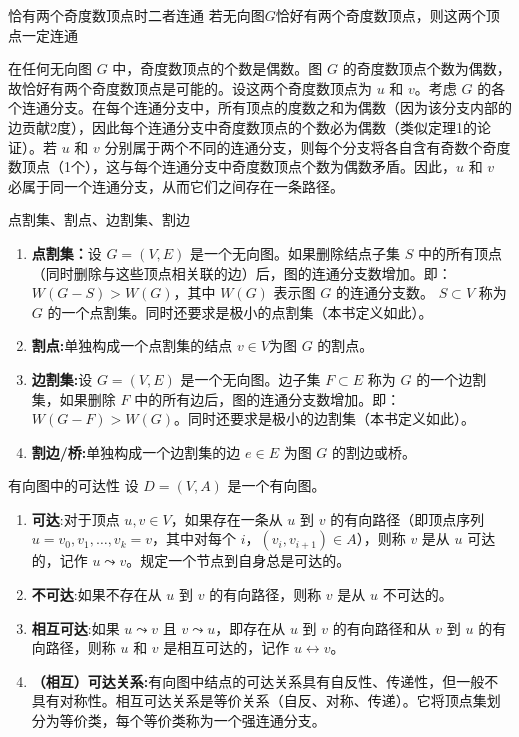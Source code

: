 \documentclass[lang=cn,11pt]{elegantbook}
\begin{document}
\begin{theorem}{恰有两个奇度数顶点时二者连通}
若无向图$G$恰好有两个奇度数顶点，则这两个顶点一定连通
\end{theorem}
在任何无向图 $G$ 中，奇度数顶点的个数是偶数。图 $G$ 的奇度数顶点个数为偶数，故恰好有两个奇度数顶点是可能的。设这两个奇度数顶点为 $u$ 和 $v$。考虑 $G$ 的各个连通分支。在每个连通分支中，所有顶点的度数之和为偶数（因为该分支内部的边贡献2度），因此每个连通分支中奇度数顶点的个数必为偶数（类似定理1的论证）。若 $u$ 和 $v$ 分别属于两个不同的连通分支，则每个分支将各自含有奇数个奇度数顶点（1个），这与每个连通分支中奇度数顶点个数为偶数矛盾。因此，$u$ 和 $v$ 必属于同一个连通分支，从而它们之间存在一条路径。
\begin{definition}{点割集、割点、边割集、割边}
\begin{enumerate}
    \item\textbf{点割集：}设 $G = (V, E)$ 是一个无向图。如果删除结点子集 $S$ 中的所有顶点（同时删除与这些顶点相关联的边）后，图的连通分支数增加。即：$W(G - S) > W(G)$，其中 $W(G)$ 表示图 $G$ 的连通分支数。 $S \subset V$ 称为 $G$ 的一个点割集。同时还要求是极小的点割集（本书定义如此）。
    \item \textbf{割点:}单独构成一个点割集的结点 $v \in V$为图 $G$ 的割点。
    \item \textbf{边割集:}设 $G = (V, E)$ 是一个无向图。边子集 $F \subset E$ 称为 $G$ 的一个边割集，如果删除 $F$ 中的所有边后，图的连通分支数增加。即：$W(G - F) > W(G)$。同时还要求是极小的边割集（本书定义如此）。
\item\textbf{割边/桥:}单独构成一个边割集的边 $e\in E$ 为图 $G$ 的割边或桥。
\end{enumerate}
\end{definition}
\begin{definition}{有向图中的可达性}
设 $D = (V, A)$ 是一个有向图。
\begin{enumerate}
\item\textbf{可达}:对于顶点 $u, v \in V$，如果存在一条从 $u$ 到 $v$ 的有向路径（即顶点序列 $u = v_0, v_1, \ldots, v_k = v$，其中对每个 $i$，$(v_i, v_{i+1}) \in A$），则称 $v$ 是从 $u$ 可达的，记作 $u \leadsto v$。规定一个节点到自身总是可达的。
\item\textbf{不可达}:如果不存在从 $u$ 到 $v$ 的有向路径，则称 $v$ 是从 $u$ 不可达的。
\item\textbf{相互可达}:如果 $u \leadsto v$ 且 $v \leadsto u$，即存在从 $u$ 到 $v$ 的有向路径和从 $v$ 到 $u$ 的有向路径，则称 $u$ 和 $v$ 是相互可达的，记作 $u \leftrightarrow v$。
\item\textbf{（相互）可达关系:}有向图中结点的可达关系具有自反性、传递性，但一般不具有对称性。相互可达关系是等价关系（自反、对称、传递）。它将顶点集划分为等价类，每个等价类称为一个强连通分支。
\end{enumerate}
\end{definition}
\end{document}

